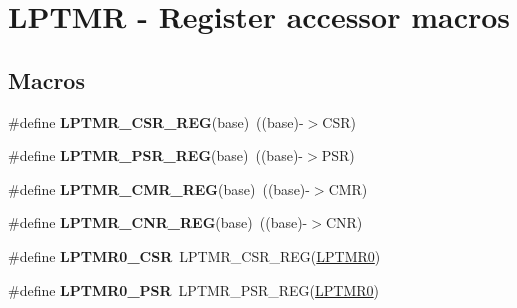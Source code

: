 \hypertarget{group__LPTMR__Register__Accessor__Macros}{}\section{L\+P\+T\+MR -\/ Register accessor macros}
\label{group__LPTMR__Register__Accessor__Macros}
\subsection*{Macros}
\begin{DoxyCompactItemize}
\item 
\#define {\bfseries L\+P\+T\+M\+R\+\_\+\+C\+S\+R\+\_\+\+R\+EG}(base)~((base)-\/$>$C\+SR)\hypertarget{group__LPTMR__Register__Accessor__Macros_ga3e6fc450d0d86591343057973f33b114}{}\label{group__LPTMR__Register__Accessor__Macros_ga3e6fc450d0d86591343057973f33b114}

\item 
\#define {\bfseries L\+P\+T\+M\+R\+\_\+\+P\+S\+R\+\_\+\+R\+EG}(base)~((base)-\/$>$P\+SR)\hypertarget{group__LPTMR__Register__Accessor__Macros_ga5466d25d6ed5404f2257f2d06c0d21f5}{}\label{group__LPTMR__Register__Accessor__Macros_ga5466d25d6ed5404f2257f2d06c0d21f5}

\item 
\#define {\bfseries L\+P\+T\+M\+R\+\_\+\+C\+M\+R\+\_\+\+R\+EG}(base)~((base)-\/$>$C\+MR)\hypertarget{group__LPTMR__Register__Accessor__Macros_ga0f229f84385a307ae6fa7133c9b0d2f0}{}\label{group__LPTMR__Register__Accessor__Macros_ga0f229f84385a307ae6fa7133c9b0d2f0}

\item 
\#define {\bfseries L\+P\+T\+M\+R\+\_\+\+C\+N\+R\+\_\+\+R\+EG}(base)~((base)-\/$>$C\+NR)\hypertarget{group__LPTMR__Register__Accessor__Macros_ga0256237249b333d5beffb46f115f5659}{}\label{group__LPTMR__Register__Accessor__Macros_ga0256237249b333d5beffb46f115f5659}

\item 
\#define {\bfseries L\+P\+T\+M\+R0\+\_\+\+C\+SR}~L\+P\+T\+M\+R\+\_\+\+C\+S\+R\+\_\+\+R\+EG(\hyperlink{group__LPTMR__Peripheral__Access__Layer_gaba0c3bc8a32ad5a884c99e019dbdef85}{L\+P\+T\+M\+R0})\hypertarget{group__LPTMR__Register__Accessor__Macros_ga92117617fde3b4150e2c04e6f828f565}{}\label{group__LPTMR__Register__Accessor__Macros_ga92117617fde3b4150e2c04e6f828f565}

\item 
\#define {\bfseries L\+P\+T\+M\+R0\+\_\+\+P\+SR}~L\+P\+T\+M\+R\+\_\+\+P\+S\+R\+\_\+\+R\+EG(\hyperlink{group__LPTMR__Peripheral__Access__Layer_gaba0c3bc8a32ad5a884c99e019dbdef85}{L\+P\+T\+M\+R0})\hypertarget{group__LPTMR__Register__Accessor__Macros_ga69b40af8e215d5b29b3f9677d7f8d632}{}\label{group__LPTMR__Register__Accessor__Macros_ga69b40af8e215d5b29b3f9677d7f8d632}


\end{DoxyCompactItemize}
